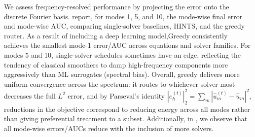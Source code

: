 \documentclass{article} %
\begin{document}
We assess frequency-resolved performance by projecting the error onto the discrete Fourier basis.  report, for modes 1, 5, and 10, the mode-wise final error and mode-wise AUC, comparing single-solver baselines, HINTS, and the greedy router. As a result of including a deep learning model,Greedy consistently achieves the smallest mode-1 error/AUC across equations and solver families. For modes 5 and 10, single-solver schedules sometimes have an edge, reflecting the tendency of classical smoothers to damp high-frequency components more aggressively than ML surrogates (spectral bias). Overall, greedy delivers more uniform convergence across the spectrum: it routes to whichever solver most decreases the full $L^2$ error, and by Parseval’s identity $|e_h^{(t)}|_2^2=\sum_m|\hat u_m^{(t)}-\hat u_m|^2$, reductions in the objective correspond to reducing energy across all modes rather than giving preferential treatment to a subset. Additionally, in , we observe that all mode-wise errors/AUCs reduce with the inclusion of more solvers. 

         
\end{document}
